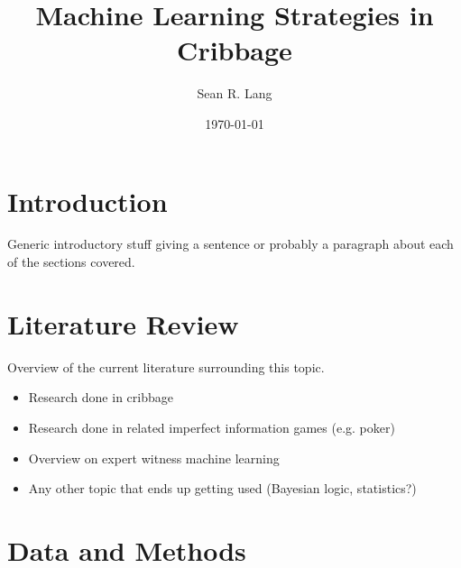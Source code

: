 \documentclass[english]{tktltiki}
\begin{document}

\title{Machine Learning Strategies in Cribbage}
\author{Sean R. Lang}
\date{\today}

\maketitle

\classification{\protect{\ \\
	}
}


\begin{abstract}

\end{abstract}


\section{Introduction}


Generic introductory stuff giving a sentence or probably a paragraph about
each of the sections covered.


\section{Literature Review}


Overview of the current literature surrounding this topic.

\begin{itemize}
	\item Research done in cribbage
	\item Research done in related imperfect information games (e.g. poker)
	\item Overview on expert witness machine learning
	\item Any other topic that ends up getting used (Bayesian logic, statistics?)
\end{itemize}


\section{Data and Methods}

\end{document}
